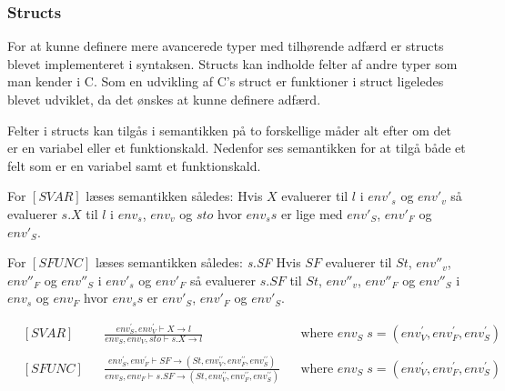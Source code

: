 \subsubsection*{Structs}
For at kunne definere mere avancerede typer med tilhørende adfærd er structs blevet implementeret i syntaksen. Structs kan indholde felter af andre typer som man kender i C. Som en udvikling af C's struct er funktioner i struct ligeledes blevet udviklet, da det ønskes at kunne definere adfærd.

Felter i structs kan tilgås i semantikken på to forskellige måder alt efter om det er en variabel eller et funktionskald. Nedenfor ses semantikken for at tilgå både et felt som er en variabel samt et funktionskald.

For $[SVAR]$ læses semantikken således:
Hvis $X$ evaluerer til $l$ i $env'_s$ og $env'_v$ så evaluerer $s.X$ til $l$ i $env_s$, $env_v$ og $sto$ hvor $env_s s$ er lige med $env'_S$, $env'_F$ og $env'_S$. 


For $[SFUNC]$ læses semantikken således: \textit{s.SF}
Hvis $SF$ evaluerer til $St$, $env''_v$, $env''_F$ og $env''_S$ i $env'_s$ og $env'_F$ så evaluerer $s.SF$ til $St$, $env''_v$, $env''_F$ og $env''_S$ i $env_s$ og $env_F$ hvor $env_s s$ er $env'_S$, $env'_F$ og $env'_S$. 


\begin{align*}
&[SVAR] & &\frac{env_S^\prime, env_V^\prime \vdash X \rightarrow l}{env_S, env_V, sto \vdash s.X \rightarrow l} & &\text{where } env_S\; s = (env_V^\prime, env_F^\prime, env_S^\prime)\\\\
&[SFUNC] & &\frac{env_S^\prime, env_F^\prime \vdash SF \rightarrow (St, env_V^{\prime\prime}, env_F^{\prime\prime}, env_S^{\prime\prime})}{env_S, env_F \vdash s.SF \rightarrow (St, env_V^{\prime\prime}, env_F^{\prime\prime}, env_S^{\prime\prime})} & &\text{where } env_S\; s = (env_V^\prime, env_F^\prime, env_S^\prime)
\end{align*}